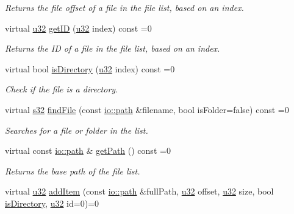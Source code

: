 \begin{DoxyCompactItemize}
\begin{DoxyCompactList}\small\item\em Returns the file offset of a file in the file list, based on an index. \end{DoxyCompactList}\item 
virtual \hyperlink{namespaceirr_a0416a53257075833e7002efd0a18e804}{u32} \hyperlink{classirr_1_1io_1_1IFileList_a9f633344aa2bb36f619d1ca8472b46b6}{get\+ID} (\hyperlink{namespaceirr_a0416a53257075833e7002efd0a18e804}{u32} index) const =0
\begin{DoxyCompactList}\small\item\em Returns the ID of a file in the file list, based on an index. \end{DoxyCompactList}\item 
virtual bool \hyperlink{classirr_1_1io_1_1IFileList_a0f2cb8c99e9ecc4b56d08718c885a5af}{is\+Directory} (\hyperlink{namespaceirr_a0416a53257075833e7002efd0a18e804}{u32} index) const =0
\begin{DoxyCompactList}\small\item\em Check if the file is a directory. \end{DoxyCompactList}\item 
virtual \hyperlink{namespaceirr_ac66849b7a6ed16e30ebede579f9b47c6}{s32} \hyperlink{classirr_1_1io_1_1IFileList_a2b0fce45cbea72f5c6dc13eb85183054}{find\+File} (const \hyperlink{namespaceirr_1_1io_ab1bdc45edb3f94d8319c02bc0f840ee1}{io\+::path} \&filename, bool is\+Folder=false) const =0
\begin{DoxyCompactList}\small\item\em Searches for a file or folder in the list. \end{DoxyCompactList}\item 
\mbox{\label{classirr_1_1io_1_1IFileList_ac3473e66ba9c3cee2e06c1fb46493e88}} 
virtual const \hyperlink{namespaceirr_1_1io_ab1bdc45edb3f94d8319c02bc0f840ee1}{io\+::path} \& \hyperlink{classirr_1_1io_1_1IFileList_ac3473e66ba9c3cee2e06c1fb46493e88}{get\+Path} () const =0
\begin{DoxyCompactList}\small\item\em Returns the base path of the file list. \end{DoxyCompactList}\item 
virtual \hyperlink{namespaceirr_a0416a53257075833e7002efd0a18e804}{u32} \hyperlink{classirr_1_1io_1_1IFileList_ad0d90f1bb8a35910f4f877268e2f043e}{add\+Item} (const \hyperlink{namespaceirr_1_1io_ab1bdc45edb3f94d8319c02bc0f840ee1}{io\+::path} \&full\+Path, \hyperlink{namespaceirr_a0416a53257075833e7002efd0a18e804}{u32} offset, \hyperlink{namespaceirr_a0416a53257075833e7002efd0a18e804}{u32} size, bool \hyperlink{classirr_1_1io_1_1IFileList_a0f2cb8c99e9ecc4b56d08718c885a5af}{is\+Directory}, \hyperlink{namespaceirr_a0416a53257075833e7002efd0a18e804}{u32} id=0)=0

\end{DoxyCompactItemize}
